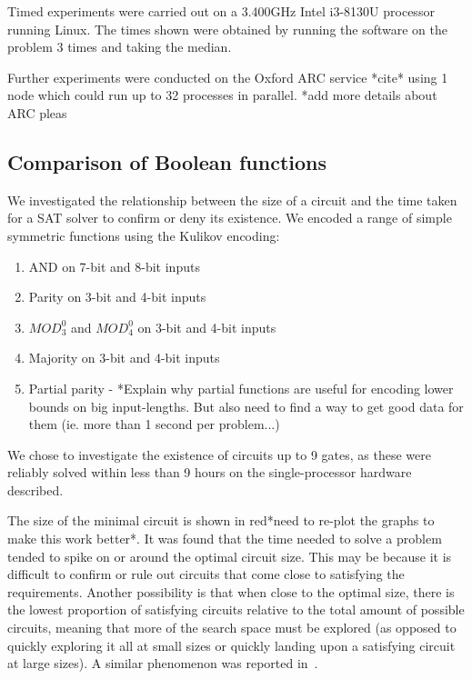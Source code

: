 \documentclass{article}
\begin{document}
Timed experiments were carried out on a 3.400GHz Intel i3-8130U processor running Linux. The times shown were obtained by running the software on the problem 3 times and taking the median.

Further experiments were conducted on the Oxford ARC service *cite* using 1 node which could run up to 32 processes in parallel. *add more details about ARC pleas

\subsection{Comparison of Boolean functions}\label{funcresults}

We investigated the relationship between the size of a circuit and the time taken for a SAT solver to confirm or deny its existence. We encoded a range of simple symmetric functions using the Kulikov encoding:

\begin{enumerate}
  \item AND on 7-bit and 8-bit inputs
  \item Parity on 3-bit and 4-bit inputs
  \item \(MOD^0_3\) and \(MOD^0_4\) on 3-bit and 4-bit inputs
  \item Majority on 3-bit and 4-bit inputs
  \item Partial parity - *Explain why partial functions are useful for encoding lower bounds on big input-lengths. But also need to find a way to get good data for them (ie. more than 1 second per problem...)

\end{enumerate}

We chose to investigate the existence of circuits up to 9 gates, as these were reliably solved within less than 9 hours on the single-processor hardware described.

The size of the minimal circuit is shown in red*need to re-plot the graphs to make this work better*. It was found that the time needed to solve a problem tended to spike on or around the optimal circuit size. This may be because it is difficult to confirm or rule out circuits that come close to satisfying the requirements. Another possibility is that when close to the optimal size, there is the lowest proportion of satisfying circuits relative to the total amount of possible circuits, meaning that more of the search space must be explored (as opposed to quickly exploring it all at small sizes or quickly landing upon a satisfying circuit at large sizes). A similar phenomenon was reported in~\cite{estrada}. 
\end{document}
